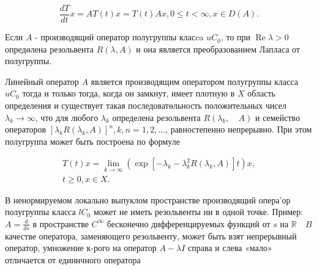 \documentclass[10pt]{article}
\begin{document}
\[

\frac{d T}{d t} x=A T(t) x=T(t) A x, 0 \leqslant t<\infty, x \in D(A) .

\]



Если $A$ - производящий оператор полугруппы класca $u C_{0}$, то при $\operatorname{Re} \lambda>0$ опредөлена резольвента $R(\lambda, A)$ и она является преобразованием Лапласа от полугруппы.



Линейный оператор $A$ является производящим оператором полугруппы класса $u C_{0}$ тогда и только тогда, когда он замкнут, имеет плотную в $X$ область определения и существует такая последоватөльность положительных чисел $\lambda_{k} \rightarrow \infty$, что для любого $\lambda_{k}$ определена резольвента $R\left(\lambda_{k}, \quad A\right)$ и семейство операторов $\left[\lambda_{k} R\left(\lambda_{k}, A\right)\right]^{n}, k, n=1,2, \ldots$, равностепенно непрерывно. При этом полугруппа может быть построена по формуле



\[

\begin{gathered}

T(t) x=\lim _{k \rightarrow \infty}\left(\exp \left[-\lambda_{k}-\lambda_{k}^{2} R\left(\lambda_{k}, A\right)\right] t\right) x, \\

t \geqslant 0, x \in X .

\end{gathered}

\]



В ненормируемом локально выпуклом пространстве производящий опера'ор полугруппы класса $l C_{0}$ может не иметь резольвенты ни в одной точке. Пример: $A=\frac{d}{d s}$ в пространстве $C^{\infty}$ бесконечно дифференцируемых функций от $s$ на $\mathbb{R} \quad B$ качестве оператора, заменяющего резольвенту, может быть взят непрерывный оператор, умножение к-рого на оператор $A-\lambda I$ справа и слева «мало» отличается от единичного оператора
\end{document}
